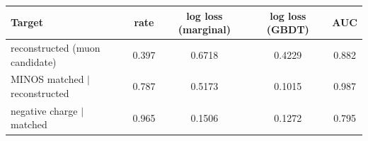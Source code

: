 \begin{tabular}{lcccc}
\toprule
Target & rate & log loss (marginal) & log loss (GBDT) & AUC \\
\midrule
reconstructed (muon candidate) & 0.397 & 0.6718 & 0.4229 & 0.882 \\
MINOS matched $\mid$ reconstructed & 0.787 & 0.5173 & 0.1015 & 0.987 \\
negative charge $\mid$ matched & 0.965 & 0.1506 & 0.1272 & 0.795 \\
\bottomrule
\end{tabular}
